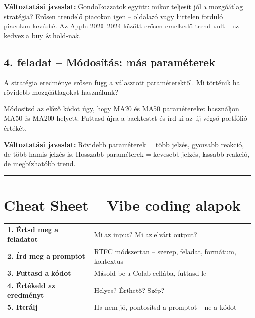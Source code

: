 \documentclass[11pt,a4paper]{article}
\newcommand{\note}[1]{%
  \vspace{3pt}%
  \begin{tcolorbox}[notestyle]%
  \textbf{\textcolor{noteborder}{Változtatási javaslat:}} #1%
  \end{tcolorbox}\vspace{2pt}}
\newcommand{\lbl}[1]{\vspace{6pt}\noindent{\small\bfseries\textcolor{labelcolor}{#1}}\par\smallskip}
\begin{document}
\note{Gondolkozzatok együtt: mikor teljesít jól a mozgóátlag stratégia?
Erősen trendelő piacokon igen -- oldalazó vagy hirtelen forduló piacokon kevésbé.
Az Apple 2020--2024 között erősen emelkedő trend volt -- ez kedvez a buy \& hold-nak.}

\bigskip

\subsection{4. feladat -- Módosítás: más paraméterek}

\noindent A stratégia eredménye erősen függ a választott paraméterektől.
Mi történik ha rövidebb mozgóátlagokat használunk?

\bigskip

\lbl{Módosító prompt:}

\begin{prompt}
Módosítsd az előző kódot úgy, hogy MA20 és MA50 paramétereket
használjon MA50 és MA200 helyett.
Futtasd újra a backtestet és írd ki az új végső portfólió értékét.
\end{prompt}

\note{Rövidebb paraméterek = több jelzés, gyorsabb reakció, de több hamis jelzés is.
Hosszabb paraméterek = kevesebb jelzés, lassabb reakció, de megbízhatóbb trend.}

\bigskip\noindent\rule{\linewidth}{0.4pt}\bigskip

\newpage
\section*{Cheat Sheet -- Vibe coding alapok}

\begin{tcolorbox}[cheatstyle, title={A vibe coding lépései}]
\begin{tabularx}{\linewidth}{@{}lX@{}}
\textbf{1. Értsd meg a feladatot} & Mi az input? Mi az elvárt output? \\[3pt]
\textbf{2. Írd meg a promptot} & RTFC módszertan -- szerep, feladat, formátum, kontextus \\[3pt]
\textbf{3. Futtasd a kódot} & Másold be a Colab cellába, futtasd le \\[3pt]
\textbf{4. Értékeld az eredményt} & Helyes? Érthető? Szép? \\[3pt]
\textbf{5. Iterálj} & Ha nem jó, pontosítsd a promptot -- ne a kódot \\
\end{tabularx}
\end{tcolorbox}
\end{document}
